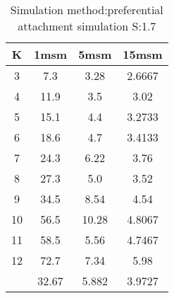 \begin{table}[H]
\centering
\begin{tabular}{c|ccc}
K &1msm &5msm &15msm\\
\hline
3 & 7.3 & 3.28 & 2.6667\\
4 & 11.9 & 3.5 & 3.02\\
5 & 15.1 & 4.4 & 3.2733\\
6 & 18.6 & 4.7 & 3.4133\\
7 & 24.3 & 6.22 & 3.76\\
8 & 27.3 & 5.0 & 3.52\\
9 & 34.5 & 8.54 & 4.54\\
10 & 56.5 & 10.28 & 4.8067\\
11 & 58.5 & 5.56 & 4.7467\\
12 & 72.7 & 7.34 & 5.98\\
\hline
& 32.67 & 5.882 & 3.9727\\
\end{tabular}
\caption{Simulation method:preferential attachment simulation S:1.7}
\label{tab:s1.7}
\end{table}
